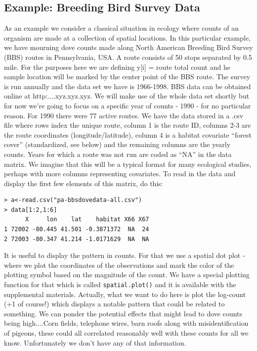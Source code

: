 \subsection{Example: Breeding Bird Survey Data}

As an example we consider a classical situation in ecology where counts of an organism are made at a collection of spatial locations. In this particular example, we have mourning dove counts made along North American Breeding Bird Survey (BBS) routes in Pennsylvania, USA. A route consists of 50 stops separated by 0.5 mile. For the purposes here we are defining y[i] = route total count and he sample location will be marked by the center point of the BBS route.  The survey is run annually and the data set we have is 1966-1998. BBS data can be obtained online at http:....xyz.xyz.xyz.  We will make use of the whole data set shortly but for now we're going to focus on a specific year of counts - 1990 - for no particular reason. For 1990 there were 77 active routes. We have the data stored in a .csv file where rows index the unique route, column 1 is the route ID, columns 2-3 are the route coordinates (longitude/latitude), column 4 is a habitat covariate ``forest cover'' (standardized, see below) and the remaining columns are the yearly counts. Years for which a route was not run are coded as ``NA'' in the data matrix. We imagine that this will be a typical format for many ecological studies, perhaps with more columns representing covariates.  To read in the data and display the first few elements of this matrix, do this:

\begin{verbatim}
> a<-read.csv("pa-bbsdovedata-all.csv")
> data[1:2,1:6]
      X     lon    lat    habitat X66 X67
1 72002 -80.445 41.501 -0.3871372  NA  24
2 72003 -80.347 41.214 -1.0171629  NA  NA
\end{verbatim}

It is useful to display the pattern in counts. For that we use a spatial dot plot - where we plot the coordinates of the observations and mark the color of the plotting symbol based on the magnitude of the count.  We have a special plotting function for that which is called \mbox{\tt spatial.plot()} and it is available with the supplemental materials. Actually, what we want to do here is plot the log-count (+1 of course!) which displays a notable pattern that could be related to something. We can ponder the potential effects that might lead to dove counts being high....Corn fields, telephone wires, barn roofs along with misidentification of pigeons, these could all correlated reasonably well with these counts for all we know. Unfortunately we don't have any of that information. 

